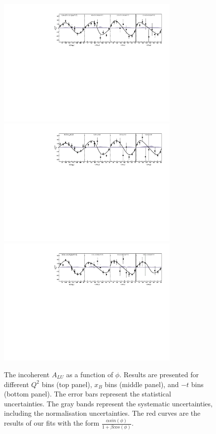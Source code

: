 \documentclass[twocolumn,nofootinbib,showpacs,prl,superscriptaddress,secnumarabic,amssymb,nobibnotes,aps,floatfix]{revtex4}
\begin{document}
\begin{figure}[tb]
\includegraphics[width=8.9cm]{figs/ALU_phi_p_Q2.pdf}
\includegraphics[width=8.9cm]{figs/ALU_phi_p_x.pdf}
\includegraphics[width=8.9cm]{figs/ALU_phi_p_t.pdf}
\caption{The incoherent $A_{LU}$ as a function of $\phi$. Results are presented
   for different $Q^{2}$ bins (top panel), $x_{B}$ bins (middle panel), and 
   $-t$ bins (bottom panel).  The error bars represent the statistical 
uncertainties. The gray bands represent the systematic uncertainties, including 
the normalisation uncertainties. The red curves are the results of our fits 
with the form $\frac{\alpha sin(\phi)}{1+ \beta cos(\phi)}$.}
\label{fig:alu}
\end{figure}
\end{document}
